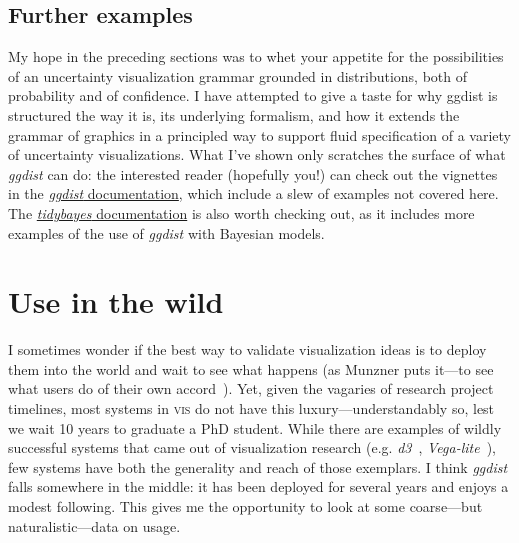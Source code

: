\documentclass[journal]{vgtc}                     %
\begin{document}
\subsection{Further examples}

My hope in the preceding sections was to whet your appetite for the possibilities of an uncertainty visualization grammar grounded in distributions, both of probability and of confidence. I have attempted to give a taste for why ggdist is structured the way it is, its underlying formalism, and how it extends the grammar of graphics in a principled way to support fluid specification of a variety of uncertainty visualizations. What I've shown only scratches the surface of what \textit{ggdist} can do: the interested reader (hopefully you!) can check out the vignettes in the \href{https://mjskay.github.io/ggdist/}{\textit{ggdist} documentation}, which include a slew of examples not covered here. The \href{https://mjskay.github.io/tidybayes/}{\textit{tidybayes} documentation} is also worth checking out, as it includes more examples of the use of \textit{ggdist} with Bayesian models.

\section{Use in the wild}
\label{sec:use-in-the-wild}


I sometimes wonder if the best way to validate visualization ideas is to deploy them into the world and wait to see what happens (as Munzner puts it---to see what users do of their own accord~\cite{munzner2009nested}). Yet, given the vagaries of research project timelines, most systems in \textsc{vis} do not have this luxury---understandably so, lest we wait 10 years to graduate a PhD student. While there are examples of wildly successful systems that came out of visualization research (e.g. \textit{d3}~\cite{bostock2011d3}, \textit{Vega-lite}~\cite{satyanarayan2016vega}), few systems have both the generality and reach of those exemplars. I think \textit{ggdist} falls somewhere in the middle: it has been deployed for several years and enjoys a modest following. This gives me the opportunity to look at some coarse---but naturalistic---data on usage.
\end{document}
